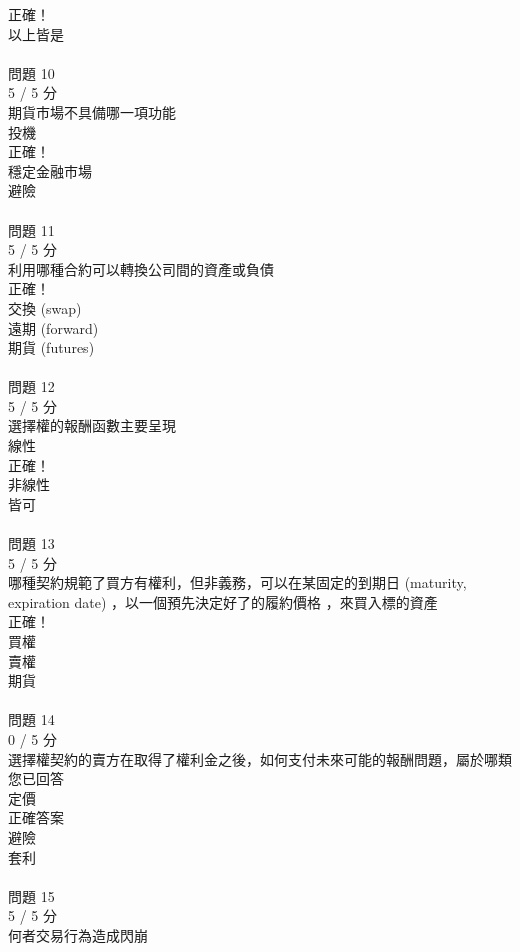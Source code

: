 \begin{multicols}{3}
正確！\\
  以上皆是 \\
 \\
問題 10\\
5 / 5 分\\
期貨市場不具備哪一項功能\\
  投機 \\
正確！\\
  穩定金融市場 \\
  避險 \\
 \\
問題 11\\
5 / 5 分\\
利用哪種合約可以轉換公司間的資產或負債\\
正確！\\
  交換 (swap) \\
  遠期 (forward) \\
  期貨 (futures) \\
 \\
問題 12\\
5 / 5 分\\
選擇權的報酬函數主要呈現\\
  線性 \\
正確！\\
  非線性 \\
  皆可 \\
 \\
問題 13\\
5 / 5 分\\
哪種契約規範了買方有權利，但非義務，可以在某固定的到期日 (maturity, expiration date) ，以一個預先決定好了的履約價格 ，來買入標的資產\\
正確！\\
  買權 \\
  賣權 \\
  期貨 \\
 \\
問題 14\\
0 / 5 分\\
選擇權契約的賣方在取得了權利金之後，如何支付未來可能的報酬問題，屬於哪類\\
您已回答\\
  定價 \\
正確答案\\
  避險 \\
  套利 \\
 \\
問題 15\\
5 / 5 分\\
何者交易行為造成閃崩\\

\end{multicols}
